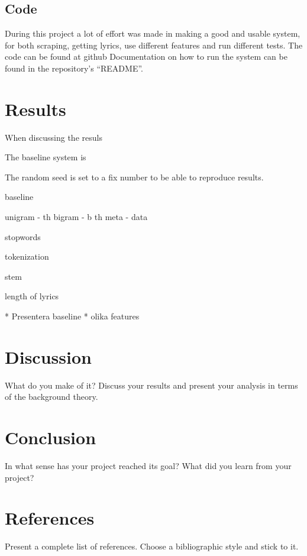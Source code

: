 \documentclass[a4paper, 12pt]{article}
\begin{document}
\subsection{Code}
During this project a lot of effort was made in making a good and usable system, for both scraping, getting lyrics, use different features and run different tests.
The code can be found at github 
Documentation on how to run the system can be found in the repository's ``README''.

\section{Results}
When discussing the resuls

The baseline system is 



The random seed is set to a fix number to be able to reproduce results.

baseline

unigram - th
bigram - b th
meta - data

stopwords

tokenization

stem

length of lyrics


* Presentera baseline
* olika features
\section{Discussion}
What do you make of it? Discuss your results and
present your analysis in terms of the background theory. \cite{Tsaptsinos2017}
\section{Conclusion}
In what sense has your project reached its goal? What
did you learn from your project?
\cite{Canicatti}
\section*{References}
Present a complete list of references. Choose a
bibliographic style and stick to it.




\end{document}

